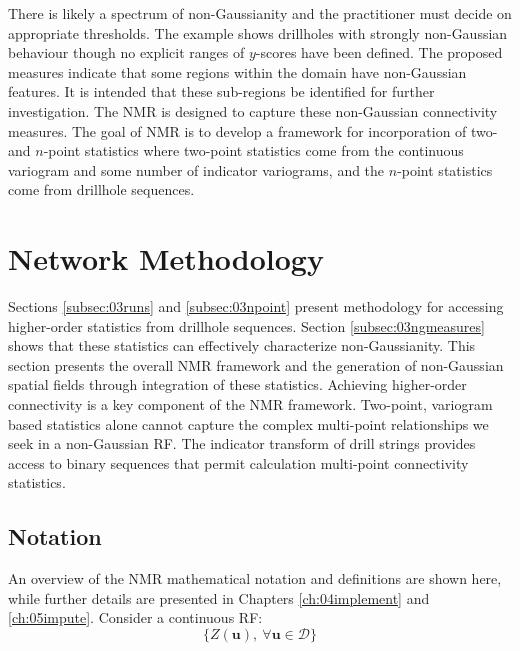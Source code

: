 There is likely a spectrum of non-Gaussianity and the practitioner must decide on appropriate thresholds. The example shows drillholes with strongly non-Gaussian behaviour though no explicit ranges of $y$-scores have been defined. The proposed measures indicate that some regions within the domain have non-Gaussian features. It is intended that these sub-regions be identified for further investigation. The \gls{NMR} is designed to capture these non-Gaussian connectivity measures. The goal of \gls{NMR} is to develop a framework for incorporation of two- and $n$-point statistics where two-point statistics come from the continuous variogram and some number of indicator variograms, and the $n$-point statistics come from drillhole sequences.


\FloatBarrier
\section{Network Methodology}
\label{sec:method}

Sections \ref{subsec:03runs} and \ref{subsec:03npoint} present methodology for accessing higher-order statistics from drillhole sequences. Section \ref{subsec:03ngmeasures} shows that these statistics can effectively characterize non-Gaussianity. This section presents the overall \gls{NMR} framework and the generation of non-Gaussian spatial fields through integration of these statistics. Achieving higher-order connectivity is a key component of the \gls{NMR} framework. Two-point, variogram based statistics alone cannot capture the complex multi-point relationships we seek in a non-Gaussian \gls{RF}. The indicator transform of drill strings provides access to binary sequences that permit calculation multi-point connectivity statistics.


\FloatBarrier
\subsection{Notation}
\label{subsec:03notation}

An overview of the \gls{NMR} mathematical notation and definitions are shown here, while further details are presented in Chapters \ref{ch:04implement} and \ref{ch:05impute}. Consider a continuous \gls{RF}:
\begin{equation}
    \{Z(\mathbf{u}), \ \forall \mathbf{u} \in \mathcal{D}\}
    \label{eq:zu}
\end{equation}


